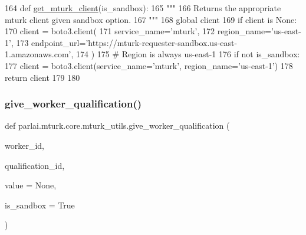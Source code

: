 \begin{DoxyCode}
164 \textcolor{keyword}{def }\hyperlink{namespaceparlai_1_1mturk_1_1core_1_1mturk__utils_a577e2527c04682284394b0951a090695}{get\_mturk\_client}(is\_sandbox):
165     \textcolor{stringliteral}{"""}
166 \textcolor{stringliteral}{    Returns the appropriate mturk client given sandbox option.}
167 \textcolor{stringliteral}{    """}
168     \textcolor{keyword}{global} client
169     \textcolor{keywordflow}{if} client \textcolor{keywordflow}{is} \textcolor{keywordtype}{None}:
170         client = boto3.client(
171             service\_name=\textcolor{stringliteral}{'mturk'},
172             region\_name=\textcolor{stringliteral}{'us-east-1'},
173             endpoint\_url=\textcolor{stringliteral}{'https://mturk-requester-sandbox.us-east-1.amazonaws.com'},
174         )
175         \textcolor{comment}{# Region is always us-east-1}
176         \textcolor{keywordflow}{if} \textcolor{keywordflow}{not} is\_sandbox:
177             client = boto3.client(service\_name=\textcolor{stringliteral}{'mturk'}, region\_name=\textcolor{stringliteral}{'us-east-1'})
178     \textcolor{keywordflow}{return} client
179 
180 
\end{DoxyCode}
\mbox{\label{namespaceparlai_1_1mturk_1_1core_1_1mturk__utils_a640e2d9d121507f92649cccbd27e3af9}} 
\subsubsection{\texorpdfstring{give\+\_\+worker\+\_\+qualification()}{give\_worker\_qualification()}}
{\footnotesize\ttfamily def parlai.\+mturk.\+core.\+mturk\+\_\+utils.\+give\+\_\+worker\+\_\+qualification (\begin{DoxyParamCaption}\item[{}]{worker\+\_\+id,  }\item[{}]{qualification\+\_\+id,  }\item[{}]{value = {\ttfamily None},  }\item[{}]{is\+\_\+sandbox = {\ttfamily True} }\end{DoxyParamCaption})}

